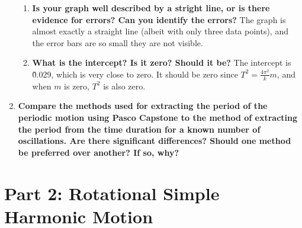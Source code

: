 \documentclass[11pt]{article}
\begin{document}
\begin{enumerate}
{\begin{enumerate}
                    \item{
                        \textbf{Is your graph well described by a stright line, or is there evidence for errors? Can you identify the errors?}
                        The graph is almost exactly a straight line (albeit with only three data points), and the error bars are so small they are not visible.
                    }
                    \item{
                        \textbf{What is the intercept? Is it zero? Should it be?}
                        The intercept is \~0.029, which is very close to zero. It should be zero since $T^2=\frac{4\pi^2}{k}m$, and when $m$ is zero, $T^2$ is also zero.
                    }
                \end{enumerate}
            }
            \item{
                \textbf{Compare the methods used for extracting the period of the periodic motion using Pasco Capstone to the method of extracting the period from the time duration for a known number of oscillations. Are there significant differences? Should one method be preferred over another? If so, why?}
            }
        \end{enumerate}
\section*{Part 2: Rotational Simple Harmonic Motion}
\end{document}
